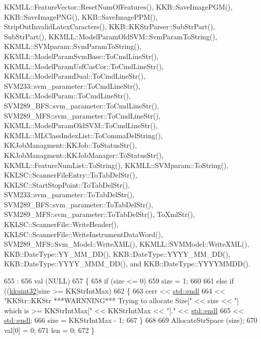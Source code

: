 K\+K\+M\+L\+L\+::\+Feature\+Vector\+::\+Reset\+Num\+Of\+Features(), K\+K\+B\+::\+Save\+Image\+P\+G\+M(), K\+K\+B\+::\+Save\+Image\+P\+N\+G(), K\+K\+B\+::\+Save\+Image\+P\+P\+M(), Strip\+Out\+Invalid\+Latex\+Caracters(), K\+K\+B\+::\+K\+K\+Str\+Parser\+::\+Sub\+Str\+Part(), Sub\+Str\+Part(), K\+K\+M\+L\+L\+::\+Model\+Param\+Old\+S\+V\+M\+::\+Svm\+Param\+To\+String(), K\+K\+M\+L\+L\+::\+S\+V\+Mparam\+::\+Svm\+Param\+To\+String(), K\+K\+M\+L\+L\+::\+Model\+Param\+Svm\+Base\+::\+To\+Cmd\+Line\+Str(), K\+K\+M\+L\+L\+::\+Model\+Param\+Usf\+Cas\+Cor\+::\+To\+Cmd\+Line\+Str(), K\+K\+M\+L\+L\+::\+Model\+Param\+Dual\+::\+To\+Cmd\+Line\+Str(), S\+V\+M233\+::svm\+\_\+parameter\+::\+To\+Cmd\+Line\+Str(), K\+K\+M\+L\+L\+::\+Model\+Param\+::\+To\+Cmd\+Line\+Str(), S\+V\+M289\+\_\+\+B\+F\+S\+::svm\+\_\+parameter\+::\+To\+Cmd\+Line\+Str(), S\+V\+M289\+\_\+\+M\+F\+S\+::svm\+\_\+parameter\+::\+To\+Cmd\+Line\+Str(), K\+K\+M\+L\+L\+::\+Model\+Param\+Old\+S\+V\+M\+::\+To\+Cmd\+Line\+Str(), K\+K\+M\+L\+L\+::\+M\+L\+Class\+Index\+List\+::\+To\+Comma\+Del\+String(), K\+K\+Job\+Managment\+::\+K\+K\+Job\+::\+To\+Status\+Str(), K\+K\+Job\+Managment\+::\+K\+K\+Job\+Manager\+::\+To\+Status\+Str(), K\+K\+M\+L\+L\+::\+Feature\+Num\+List\+::\+To\+String(), K\+K\+M\+L\+L\+::\+S\+V\+Mparam\+::\+To\+String(), K\+K\+L\+S\+C\+::\+Scanner\+File\+Entry\+::\+To\+Tab\+Del\+Str(), K\+K\+L\+S\+C\+::\+Start\+Stop\+Point\+::\+To\+Tab\+Del\+Str(), S\+V\+M233\+::svm\+\_\+parameter\+::\+To\+Tab\+Del\+Str(), S\+V\+M289\+\_\+\+B\+F\+S\+::svm\+\_\+parameter\+::\+To\+Tab\+Del\+Str(), S\+V\+M289\+\_\+\+M\+F\+S\+::svm\+\_\+parameter\+::\+To\+Tab\+Del\+Str(), To\+Xml\+Str(), K\+K\+L\+S\+C\+::\+Scanner\+File\+::\+Write\+Header(), K\+K\+L\+S\+C\+::\+Scanner\+File\+::\+Write\+Instrument\+Data\+Word(), S\+V\+M289\+\_\+\+M\+F\+S\+::\+Svm\+\_\+\+Model\+::\+Write\+X\+M\+L(), K\+K\+M\+L\+L\+::\+S\+V\+M\+Model\+::\+Write\+X\+M\+L(), K\+K\+B\+::\+Date\+Type\+::\+Y\+Y\+\_\+\+M\+M\+\_\+\+D\+D(), K\+K\+B\+::\+Date\+Type\+::\+Y\+Y\+Y\+Y\+\_\+\+M\+M\+\_\+\+D\+D(), K\+K\+B\+::\+Date\+Type\+::\+Y\+Y\+Y\+Y\+\_\+\+M\+M\+M\+\_\+\+D\+D(), and K\+K\+B\+::\+Date\+Type\+::\+Y\+Y\+Y\+Y\+M\+M\+D\+D().


\begin{DoxyCode}
655                           :
656         val (NULL)
657 \{
658   \textcolor{keywordflow}{if}  (size <= 0)
659     size = 1;
660 
661   \textcolor{keywordflow}{else} \textcolor{keywordflow}{if}  ((\hyperlink{namespace_k_k_b_af8d832f05c54994a1cce25bd5743e19a}{kkuint32})size >= KKStrIntMax)
662   \{
663     cerr  << \hyperlink{namespace_k_k_b_ad1f50f65af6adc8fa9e6f62d007818a8}{std::endl} 
664           << \textcolor{stringliteral}{"KKStr::KKStr    ***WARNNING***   Trying to allocate Size["} << size << \textcolor{stringliteral}{"]  which is >=
       KKStrIntMax["} << KKStrIntMax << \textcolor{stringliteral}{"]."} << \hyperlink{namespace_k_k_b_ad1f50f65af6adc8fa9e6f62d007818a8}{std::endl}
665           << \hyperlink{namespace_k_k_b_ad1f50f65af6adc8fa9e6f62d007818a8}{std::endl};
666     size = KKStrIntMax - 1;
667   \}
668 
669   AllocateStrSpace (size);
670   val[0] = 0;
671   len = 0;
672 \}
\end{DoxyCode}
